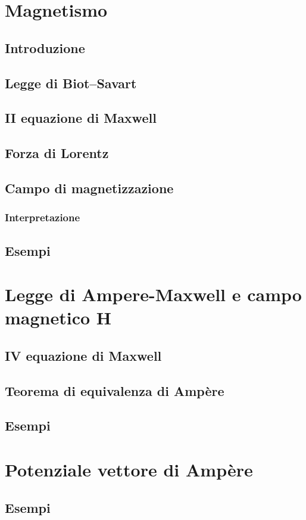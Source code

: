 \documentclass{book}
\begin{document}
\chapter{Magnetismo}
\section{Introduzione}
\section{Legge di Biot--Savart}
\section{II equazione di Maxwell}
\section{Forza di Lorentz}
\section{Campo di magnetizzazione}
\subsection{Interpretazione}
\section{Esempi}

\chapter{Legge di Ampere-Maxwell e campo magnetico H}
\section{IV equazione di Maxwell}
\section{Teorema di equivalenza di Amp\`ere}
\section{Esempi}

\chapter{Potenziale vettore di Amp\`ere}
\section{Esempi}
\end{document}

